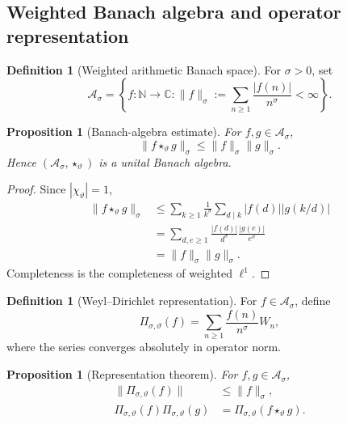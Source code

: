 \documentclass[11pt]{amsart}
\numberwithin{equation}{section}
\theoremstyle{plain}
\newtheorem{proposition}[theorem]{Proposition}
\theoremstyle{definition}
\newtheorem{definition}[theorem]{Definition}
\theoremstyle{remark}
\newcommand{\C}{\mathbb{C}}
\newcommand{\N}{\mathbb{N}}
\newcommand{\twconv}{\star_{\vartheta}}
\begin{document}
\subsection{Weighted Banach algebra and operator representation}
\label{subsec:weighted_banach_algebra}

\begin{definition}[Weighted arithmetic Banach space]
\label{def:weighted_banach_algebra}
For $\sigma>0$, set
\begin{equation}
\mathcal A_{\sigma}
=
\left\{f:\N\to\C:
\|f\|_{\sigma}:=
\sum_{n\ge1}\frac{|f(n)|}{n^{\sigma}}<\infty
\right\}.
\label{eq:A_sigma_definition}
\end{equation}
\end{definition}

\begin{proposition}[Banach-algebra estimate]
\label{prop:banach_algebra_estimate}
For $f,g\in\mathcal A_{\sigma}$,
\begin{equation}
\|f\twconv g\|_{\sigma}
\le
\|f\|_{\sigma}\|g\|_{\sigma}.
\label{eq:banach_algebra_estimate}
\end{equation}
Hence $(\mathcal A_{\sigma},\twconv)$ is a unital Banach algebra.
\end{proposition}

\begin{proof}
Since $|\chi_{\vartheta}|=1$,
\begin{align}
\|f\twconv g\|_{\sigma}
&\le
\sum_{k\ge1}\frac{1}{k^{\sigma}}
\sum_{d\mid k}|f(d)||g(k/d)|
\label{eq:banach_estimate_step1}\\
&=
\sum_{d,e\ge1}
\frac{|f(d)|}{d^{\sigma}}
\frac{|g(e)|}{e^{\sigma}}
\label{eq:banach_estimate_step2}\\
&=
\|f\|_{\sigma}\|g\|_{\sigma}.
\label{eq:banach_estimate_step3}
\end{align}
Completeness is the completeness of weighted $\ell^1$.
\end{proof}

\begin{definition}[Weyl--Dirichlet representation]
\label{def:Weyl_Dirichlet_representation}
For $f\in\mathcal A_{\sigma}$, define
\begin{equation}
\Pi_{\sigma,\vartheta}(f)
=
\sum_{n\ge1}\frac{f(n)}{n^{\sigma}}W_n,
\label{eq:Pi_definition}
\end{equation}
where the series converges absolutely in operator norm.
\end{definition}

\begin{proposition}[Representation theorem]
\label{prop:representation_theorem}
For $f,g\in\mathcal A_{\sigma}$,
\begin{align}
\|\Pi_{\sigma,\vartheta}(f)\|
&\le\|f\|_{\sigma},
\label{eq:Pi_norm_bound}\\
\Pi_{\sigma,\vartheta}(f)
\Pi_{\sigma,\vartheta}(g)
&=
\Pi_{\sigma,\vartheta}(f\twconv g).
\label{eq:Pi_homomorphism}
\end{align}
\end{proposition}
\end{document}

